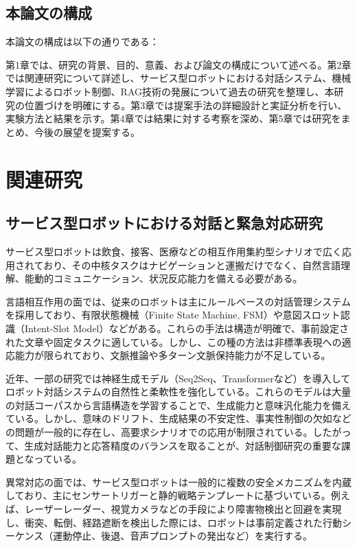 \documentclass[12pt]{report}
\begin{document}
\section{本論文の構成}
\label{sec:structure}

本論文の構成は以下の通りである：

第1章では、研究の背景、目的、意義、および論文の構成について述べる。第2章では関連研究について詳述し、サービス型ロボットにおける対話システム、機械学習によるロボット制御、RAG技術の発展について過去の研究を整理し、本研究の位置づけを明確にする。第3章では提案手法の詳細設計と実証分析を行い、実験方法と結果を示す。第4章では結果に対する考察を深め、第5章では研究をまとめ、今後の展望を提案する。

\chapter{関連研究}
\label{chap:related_work}

\section{サービス型ロボットにおける対話と緊急対応研究}
\label{sec:dialogue_emergency}

サービス型ロボットは飲食、接客、医療などの相互作用集約型シナリオで広く応用されており、その中核タスクはナビゲーションと運搬だけでなく、自然言語理解、能動的コミュニケーション、状況反応能力を備える必要がある。

言語相互作用の面では、従来のロボットは主にルールベースの対話管理システムを採用しており、有限状態機械（Finite State Machine, FSM）や意図スロット認識（Intent-Slot Model）などがある。これらの手法は構造が明確で、事前設定された文章や固定タスクに適している。しかし、この種の方法は非標準表現への適応能力が限られており、文脈推論や多ターン文脈保持能力が不足している。

近年、一部の研究では神経生成モデル（Seq2Seq、Transformerなど）を導入してロボット対話システムの自然性と柔軟性を強化している。これらのモデルは大量の対話コーパスから言語構造を学習することで、生成能力と意味汎化能力を備えている。しかし、意味のドリフト、生成結果の不安定性、事実性制御の欠如などの問題が一般的に存在し、高要求シナリオでの応用が制限されている。したがって、生成対話能力と応答精度のバランスを取ることが、対話制御研究の重要な課題となっている。

異常対応の面では、サービス型ロボットは一般的に複数の安全メカニズムを内蔵しており、主にセンサートリガーと静的戦略テンプレートに基づいている。例えば、レーザーレーダー、視覚カメラなどの手段により障害物検出と回避を実現し、衝突、転倒、経路遮断を検出した際には、ロボットは事前定義された行動シーケンス（運動停止、後退、音声プロンプトの発出など）を実行する。
\end{document}
